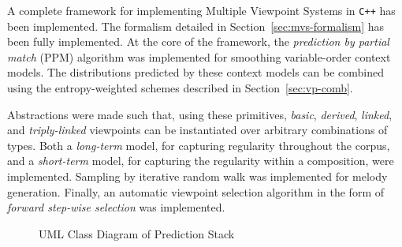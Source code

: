 \documentclass[12pt,a4paper,twoside,openright]{report}
\begin{document}
A complete framework for implementing Multiple Viewpoint Systems in \verb!C++!
has been implemented. The formalism detailed in Section~\ref{sec:mvs-formalism}
has been fully implemented.  At the core of the framework, the \emph{prediction
by partial match} (PPM) algorithm was implemented for smoothing variable-order
context models. The distributions predicted by these context models can be
combined using the entropy-weighted schemes described in
Section~\ref{sec:vp-comb}.

Abstractions were made such that, using these primitives, \emph{basic},
\emph{derived}, \emph{linked}, and \emph{triply-linked} viewpoints can be
instantiated over arbitrary combinations of types. Both a \emph{long-term}
model, for capturing regularity throughout the corpus, and a \emph{short-term}
model, for capturing the regularity within a composition, were implemented.
Sampling by iterative random walk was implemented for melody generation.
Finally, an automatic viewpoint selection algorithm in the form of \emph{forward
step-wise selection} \cite{pearce2005construction} was implemented.

\begin{figure}[H]
\centering
\hspace{-10mm}
\caption{UML Class Diagram of Prediction Stack}
\label{fig:uml-prediction}
\end{figure}
\end{document}
